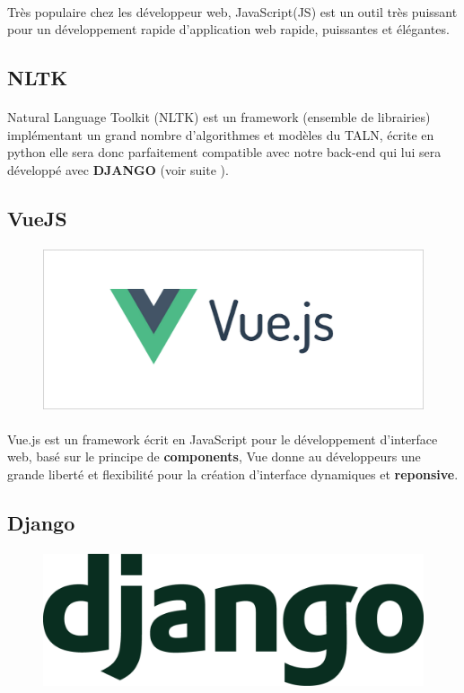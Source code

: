 \documentclass[]{report}
\begin{document}
			\paragraph{}
			Très populaire chez les développeur web, JavaScript(JS) est un outil très puissant pour un développement rapide d'application web rapide, puissantes et élégantes.
		\subsection{NLTK}
			\paragraph{}
			 Natural Language Toolkit (NLTK) est un framework (ensemble de librairies) implémentant un grand nombre d'algorithmes et modèles du TALN, écrite en python elle sera donc parfaitement compatible avec notre back-end qui lui sera développé avec \textbf{DJANGO} (voir suite ).
		\subsection{VueJS}
			\paragraph{}
			\begin{figure}[H]
				\centering
				\includegraphics[width=0.25\linewidth]{images/vjs.png}
			\end{figure}
			\paragraph{}
			Vue.js est un framework écrit en JavaScript pour le développement d'interface web, basé sur le principe de \textbf{components}, Vue donne au développeurs une grande liberté et flexibilité pour la création d'interface dynamiques
			et \textbf{reponsive}.
			
		\subsection{Django}
			\paragraph{}
			\begin{figure}[H]
				\centering
				\includegraphics[width=0.25\linewidth]{images/django.png}
			\end{figure}
\end{document}
